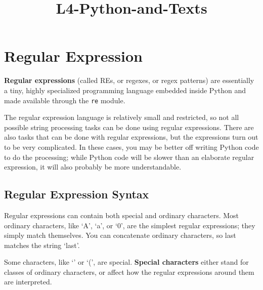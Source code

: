 \documentclass{article}
\title{L4-Python-and-Texts}
\begin{document}
    
    
    \maketitle
    
    

    
    \section{Regular Expression}\label{regular-expression}

    \textbf{Regular expressions} (called REs, or regexes, or regex patterns)
are essentially a tiny, highly specialized programming language embedded
inside Python and made available through the \texttt{re} module.

The regular expression language is relatively small and restricted, so
not all possible string processing tasks can be done using regular
expressions. There are also tasks that can be done with regular
expressions, but the expressions turn out to be very complicated. In
these cases, you may be better off writing Python code to do the
processing; while Python code will be slower than an elaborate regular
expression, it will also probably be more understandable.

    \subsection{Regular Expression Syntax}\label{regular-expression-syntax}

    Regular expressions can contain both special and ordinary characters.
Most ordinary characters, like `A', `a', or `0', are the simplest
regular expressions; they simply match themselves. You can concatenate
ordinary characters, so last matches the string `last'.

Some characters, like `\textbar{}' or `(', are special. \textbf{Special
characters} either stand for classes of ordinary characters, or affect
how the regular expressions around them are interpreted.
\end{document}
